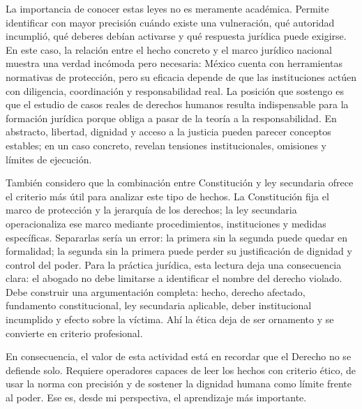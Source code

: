 \documentclass[
	spanish,
	letterpaper, oneside
]{article}
\begin{document}
La importancia de conocer estas leyes no es meramente académica. Permite identificar con mayor precisión cuándo existe una vulneración, qué autoridad incumplió, qué deberes debían activarse y qué respuesta jurídica puede exigirse. En este caso, la relación entre el hecho concreto y el marco jurídico nacional muestra una verdad incómoda pero necesaria: México cuenta con herramientas normativas de protección, pero su eficacia depende de que las instituciones actúen con diligencia, coordinación y responsabilidad real. La posición que sostengo es que el estudio de casos reales de derechos humanos resulta indispensable para la formación jurídica porque obliga a pasar de la teoría a la responsabilidad. En abstracto, libertad, dignidad y acceso a la justicia pueden parecer conceptos estables; en un caso concreto, revelan tensiones institucionales, omisiones y límites de ejecución.

También considero que la combinación entre Constitución y ley secundaria ofrece el criterio más útil para analizar este tipo de hechos. La Constitución fija el marco de protección y la jerarquía de los derechos; la ley secundaria operacionaliza ese marco mediante procedimientos, instituciones y medidas específicas. Separarlas sería un error: la primera sin la segunda puede quedar en formalidad; la segunda sin la primera puede perder su justificación de dignidad y control del poder. Para la práctica jurídica, esta lectura deja una consecuencia clara: el abogado no debe limitarse a identificar el nombre del derecho violado. Debe construir una argumentación completa: hecho, derecho afectado, fundamento constitucional, ley secundaria aplicable, deber institucional incumplido y efecto sobre la víctima. Ahí la ética deja de ser ornamento y se convierte en criterio profesional.

En consecuencia, el valor de esta actividad está en recordar que el Derecho no se defiende solo. Requiere operadores capaces de leer los hechos con criterio ético, de usar la norma con precisión y de sostener la dignidad humana como límite frente al poder. Ese es, desde mi perspectiva, el aprendizaje más importante.

% 



\end{document}

